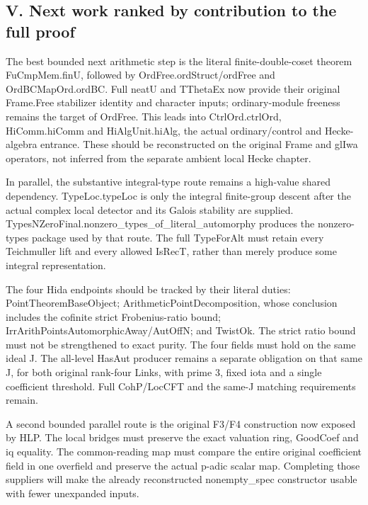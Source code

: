 \subsection{V. Next work ranked by contribution to the full proof}

The best bounded next arithmetic step is the literal finite-double-coset theorem FuCmpMem.finU, followed by OrdFree.ordStruct/\allowbreak{}ordFree and OrdBCMapOrd.ordBC. Full neatU and TThetaEx now provide their original Frame.Free stabilizer identity and character inputs; ordinary-module freeness remains the target of OrdFree. This leads into CtrlOrd.ctrlOrd, HiComm.hiComm and HiAlgUnit.hiAlg, the actual ordinary/\allowbreak{}control and Hecke-algebra entrance. These should be reconstructed on the original Frame and glIwa operators, not inferred from the separate ambient local Hecke chapter.

In parallel, the substantive integral-type route remains a high-value shared dependency. TypeLoc.typeLoc is only the integral finite-group descent after the actual complex local detector and its Galois stability are supplied. TypesNZeroFinal.nonzero\_\allowbreak{}types\_\allowbreak{}of\_\allowbreak{}literal\_\allowbreak{}automorphy produces the nonzero-types package used by that route. The full TypeForAlt must retain every Teichmuller lift and every allowed IsRecT, rather than merely produce some integral representation.

The four Hida endpoints should be tracked by their literal duties: PointTheoremBaseObject; ArithmeticPointDecomposition, whose conclusion includes the cofinite strict Frobenius-ratio bound; IrrArithPointsAutomorphicAway/\allowbreak{}AutOffN; and TwistOk. The strict ratio bound must not be strengthened to exact purity. The four fields must hold on the same ideal J. The all-level HasAut producer remains a separate obligation on that same J, for both original rank-four Links, with prime 3, fixed iota and a single coefficient threshold. Full CohP/\allowbreak{}LocCFT and the same-J matching requirements remain.

A second bounded parallel route is the original F3/\allowbreak{}F4 construction now exposed by HLP. The local bridges must preserve the exact valuation ring, GoodCoef and iq equality. The common-reading map must compare the entire original coefficient field in one overfield and preserve the actual p-adic scalar map. Completing those suppliers will make the already reconstructed nonempty\_\allowbreak{}spec constructor usable with fewer unexpanded inputs.

